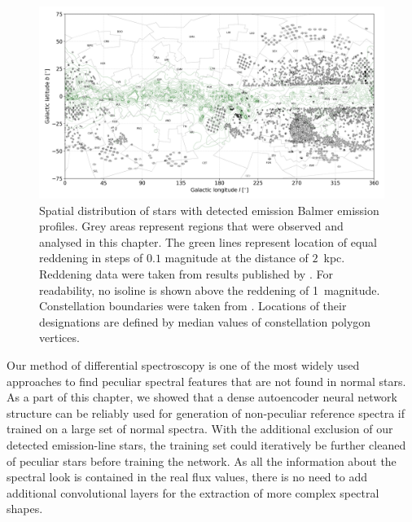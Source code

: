 \begin{figure}
	\centering
	\includegraphics[width=\textwidth]{reddening_d2000_n720_cont_wemisions.png}
	\caption{Spatial distribution of stars with detected emission Balmer emission profiles. Grey areas represent regions that were observed and analysed in this chapter. The green lines represent location of equal reddening in steps of $0.1$ magnitude at the distance of $2$~kpc. Reddening data were taken from results published by \citet{2017A&A...606A..65C}. For readability, no isoline is shown above the reddening of 1~magnitude. Constellation boundaries were taken from \citet{const_data}. Locations of their designations are defined by median values of constellation polygon vertices.}
	\label{fig:spatialemission}
\end{figure}

Our method of differential spectroscopy is one of the most widely used approaches to find peculiar spectral features that are not found in normal stars. As a part of this chapter, we showed that a dense autoencoder neural network structure can be reliably used for generation of non-peculiar reference spectra if trained on a large set of normal spectra. With the additional exclusion of our detected emission-line stars, the training set could iteratively be further cleaned of peculiar stars before training the network. As all the information about the spectral look is contained in the real flux values, there is no need to add additional convolutional layers for the extraction of more complex spectral shapes. 

